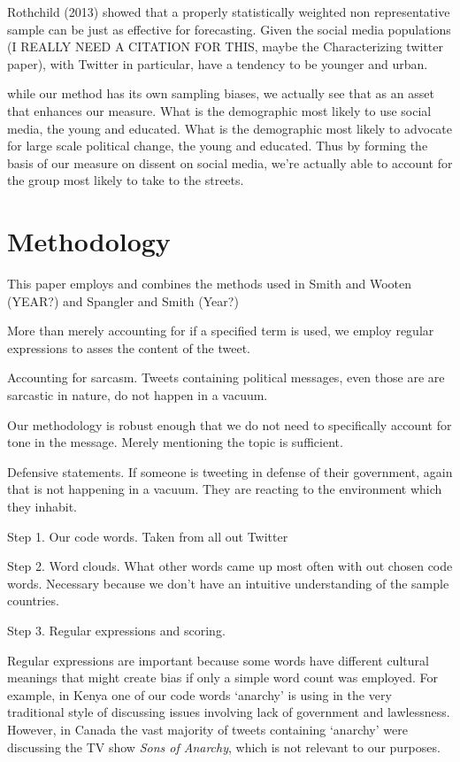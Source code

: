 \documentclass[12pt]{article}
\begin{document}
\begin{spacing}{1.5}
Rothchild (2013) showed that a properly statistically weighted non representative sample can be just as effective for forecasting. Given the social media populations (I REALLY NEED A CITATION FOR THIS, maybe the Characterizing twitter paper), with Twitter in particular, have a tendency to be younger and urban. 

while our method has its own sampling biases, we actually see that as an asset that enhances our measure. What is the demographic most likely to use social media, the young and educated. What is the demographic most likely to advocate for large scale political change, the young and educated. Thus by forming the basis of our measure on dissent on social media, we're actually able to account for the group most likely to take to the streets. 


\section*{Methodology}

This paper employs and combines the methods used in Smith and Wooten (YEAR?) and Spangler and Smith (Year?) 

More than merely accounting for if a specified term is used, we employ regular expressions to asses the content of the tweet. 



Accounting for sarcasm. Tweets containing political messages, even those are are sarcastic in nature, do not happen in a vacuum. 

Our methodology is robust enough that we do not need to specifically account for tone in the message. Merely mentioning the topic is sufficient. 


Defensive statements. If someone is tweeting in defense of their government, again that is not happening in a vacuum. They are reacting to the environment which they inhabit.  

Step 1. Our code words. Taken from all out Twitter 

Step 2. Word clouds. What other words came up most often with out chosen code words. Necessary because we don't have an intuitive understanding of the sample countries. 

Step 3. Regular expressions and scoring. 

Regular expressions are important because some words have different cultural meanings that might create bias if only a simple word count was employed. For example, in Kenya one of our code words `anarchy' is using in the very traditional style of discussing issues involving lack of government and lawlessness. However, in Canada the vast majority of tweets containing `anarchy' were discussing the TV show \textit{Sons of Anarchy}, which is not relevant to our purposes. 



\end{spacing}
\end{document}
